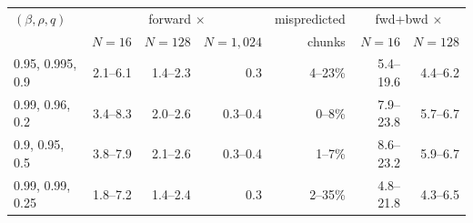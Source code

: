 \begin{tabular}{lrrrrrr}
\toprule
$(\beta,\rho,q)$ & \multicolumn{3}{c}{forward $\times$} & mispredicted & \multicolumn{2}{c}{fwd+bwd $\times$}\\
 & $N=16$ & $N=128$ & $N=1{,}024$ & chunks & $N=16$ & $N=128$\\
\midrule
0.95, 0.995, 0.9 & 2.1--6.1 & 1.4--2.3 & 0.3 & 4--23\% & 5.4--19.6 & 4.4--6.2\\
0.99, 0.96, 0.2 & 3.4--8.3 & 2.0--2.6 & 0.3--0.4 & 0--8\% & 7.9--23.8 & 5.7--6.7\\
0.9, 0.95, 0.5 & 3.8--7.9 & 2.1--2.6 & 0.3--0.4 & 1--7\% & 8.6--23.2 & 5.9--6.7\\
0.99, 0.99, 0.25 & 1.8--7.2 & 1.4--2.4 & 0.3 & 2--35\% & 4.8--21.8 & 4.3--6.5\\
\bottomrule
\end{tabular}
